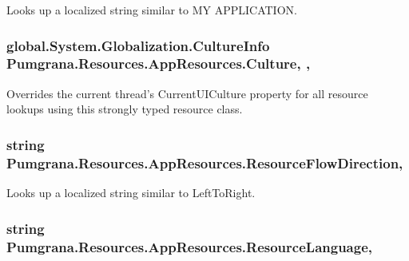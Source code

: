 Looks up a localized string similar to M\+Y A\+P\+P\+L\+I\+C\+A\+T\+I\+O\+N. 

\hypertarget{class_pumgrana_1_1_resources_1_1_app_resources_ad9f4f15fa905a17f7e7e33fa224ee82b}{
\subsubsection[{Culture}]{\setlength{\rightskip}{0pt plus 5cm}global.\+System.\+Globalization.\+Culture\+Info Pumgrana.\+Resources.\+App\+Resources.\+Culture\hspace{0.3cm}{\ttfamily [static]}, {\ttfamily [get]}, {\ttfamily [set]}}}\label{class_pumgrana_1_1_resources_1_1_app_resources_ad9f4f15fa905a17f7e7e33fa224ee82b}


Overrides the current thread's Current\+U\+I\+Culture property for all resource lookups using this strongly typed resource class. 

\hypertarget{class_pumgrana_1_1_resources_1_1_app_resources_ad2f389bab418744c24ef286d310b5fe4}{
\subsubsection[{Resource\+Flow\+Direction}]{\setlength{\rightskip}{0pt plus 5cm}string Pumgrana.\+Resources.\+App\+Resources.\+Resource\+Flow\+Direction\hspace{0.3cm}{\ttfamily [static]}, {\ttfamily [get]}}}\label{class_pumgrana_1_1_resources_1_1_app_resources_ad2f389bab418744c24ef286d310b5fe4}


Looks up a localized string similar to Left\+To\+Right. 

\hypertarget{class_pumgrana_1_1_resources_1_1_app_resources_ac94b56be19f1370de61d7fd0a3f89dc5}{
\subsubsection[{Resource\+Language}]{\setlength{\rightskip}{0pt plus 5cm}string Pumgrana.\+Resources.\+App\+Resources.\+Resource\+Language\hspace{0.3cm}{\ttfamily [static]}, {\ttfamily [get]}}}\label{class_pumgrana_1_1_resources_1_1_app_resources_ac94b56be19f1370de61d7fd0a3f89dc5}


